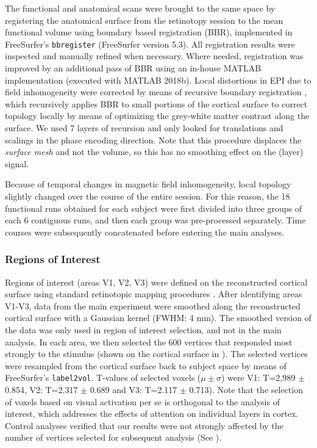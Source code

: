 \documentclass[9pt,lineno]{aperture}
\begin{document}
The functional and anatomical scans were brought to the same space by registering the anatomical surface from the retinotopy session to the mean functional volume using boundary based registration (BBR), implemented in FreeSurfer's \texttt{bbregister} \citep{Greve2009} (FreeSurfer version 5.3). All registration results were inspected and manually refined when necessary. Where needed, registration was improved by an additional pass of BBR using an in-house MATLAB implementation (executed with MATLAB 2018b). Local distortions in EPI due to field inhomogeneity were corrected by means of recursive boundary registration \citep{VanMourik2019}, which recursively applies BBR to small portions of the cortical surface to correct topology locally by means of optimizing the grey-white matter contrast along the surface. We used 7 layers of recursion and only looked for translations and scalings in the phase encoding direction. Note that this procedure displaces the \textit{surface mesh} and not the volume, so this has no smoothing effect on the (layer) signal. 

Because of temporal changes in magnetic field inhomogeneity, local topology slightly changed over the course of the entire session. For this reason, the 18 functional runs obtained for each subject were first divided into three groups of each 6 contiguous runs, and then each group was pre-processed separately. Time courses were subsequently concatenated before entering the main analyses.

\subsubsection{Regions of Interest}
Regions of interest (areas V1, V2, V3) were defined on the reconstructed cortical surface using standard retinotopic mapping procedures \citep{Sereno1995,DeYoe1996,Engel1997}. After identifying areas V1-V3, data from the main experiment were smoothed along the reconstructed cortical surface with a Gaussian kernel (FWHM: 4 mm). The smoothed version of the data was only used in region of interest selection, and not in the main analysis. In each area, we then selected the 600 vertices that responded most strongly to the stimulus (shown on the cortical surface in ). The selected vertices were resampled from the cortical surface back to subject space by means of FreeSurfer's \texttt{label2vol}. T-values of selected voxels ($\mu \pm \sigma$) were V1: T=2,989 $\pm$ 0.854, V2: T=2.317 $\pm$ 0.689 and V3: T=2.117 $\pm$ 0.713). Note that the selection of voxels based on visual activation per se is orthogonal to the analysis of interest, which addresses the effects of attention on individual layers in cortex. Control analyses verified that our results were not strongly affected by the number of vertices selected for subsequent analysis (See ).
\end{document}
